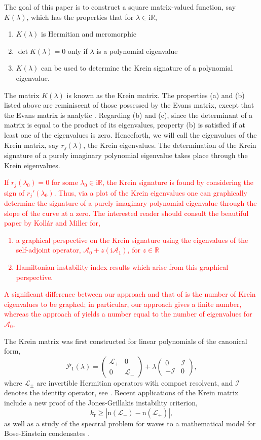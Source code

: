\documentclass[review,onefignum,onetabnum]{siamart171218}
\newcommand{\R}{\mathbb{R}}
\def\det{\mathop\mathrm{det}\nolimits}
\newcommand{\rmi}{\mathrm{i}}
\newcommand{\rmn}{\mathrm{n}}
\newcommand{\rmr}{\mathrm{r}}
\newcommand{\calA}{\mathcal{A}}
\newcommand{\calI}{\mathcal{I}}
\newcommand{\calL}{\mathcal{L}}
\newcommand{\calP}{\mathcal{P}}
\newcommand{\vK}{\bm{\mathit{K}}}
\newcommand{\revised}[1]{ \textcolor{red}{#1} }
\begin{document}
The goal of this paper is to construct a square matrix-valued function, say
$\vK(\lambda)$, which has the properties that for
$\lambda\in\rmi\R$,
\begin{enumerate}
\item $\vK(\lambda)$ is Hermitian and meromorphic
\item $\det\vK(\lambda)=0$ only if $\lambda$ is a polynomial eigenvalue
\item $\vK(\lambda)$ can be used to determine the Krein signature of a
    polynomial eigenvalue.
\end{enumerate}
The matrix $\vK(\lambda)$ is known as the Krein matrix. The properties (a) and (b) listed
above are reminiscent of those possessed by the Evans matrix, except that
the Evans matrix is analytic \cite[Chapters~8-10]{kapitula:sad13}. Regarding (b) and (c), since the determinant of a matrix is equal to the product of its eigenvalues, property (b) is satisfied if at least one of the eigenvalues is zero. Henceforth, we will call the eigenvalues of the Krein matrix, say $r_j(\lambda)$, the Krein eigenvalues. The determination of the Krein signature of a purely imaginary polynomial
eigenvalue takes place through the Krein eigenvalues.
\revised{
If $r_j(\lambda_0)=0$ for some $\lambda_0\in\rmi\R$, the Krein
signature is found by considering the sign of $r_j'(\lambda_0)$. Thus, via a plot of the Krein eigenvalues one can graphically determine the signature of a purely imaginary polynomial eigenvalue through the slope of the curve at a zero. The interested reader should consult the beautiful paper by Koll\'ar and Miller \cite{kollar:gks14} for,
\begin{enumerate}
\item a graphical perspective on the Krein signature using the eigenvalues of the self-adjoint operator, $\calA_0+z(\rmi\calA_1)$, for $z\in\R$
\item Hamiltonian instability index results which arise from this graphical perspective.
\end{enumerate}
A significant difference between our approach and that of \cite{kollar:gks14} is the number of Krein eigenvalues to be graphed; in particular, our approach gives a finite number, whereas the approach of \cite{kollar:gks14} yields a number equal to the number of eigenvalues for $\calA_0$.
}

The Krein matrix was first constructed for linear
polynomials of the canonical form,
\[
\calP_1(\lambda)=\left(\begin{array}{cc}\calL_+&0\\0&\calL_-\end{array}\right)
+\lambda\left(\begin{array}{rr}0&\calI\\-\calI&0\end{array}\right),
\]
where $\calL_\pm$ are invertible Hermitian operators with compact resolvent, and $\calI$ denotes the identity operator,
see \cite{kapitula:tks10,li:sso98}.
Recent applications of the Krein matrix include a new proof of the
Jones-Grillakis instability criterion,
\[
k_\rmr\ge|\rmn(\calL_-)-\rmn(\calL_+)|,
\]
as well as a study of the spectral problem for waves to a mathematical model
for Bose-Einstein condensates \cite{kapitula:tkm13,kapitula:sif12}.
\end{document}
